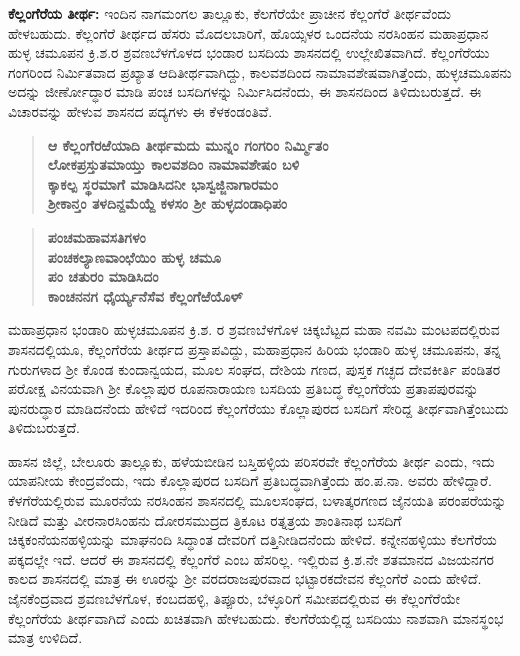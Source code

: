 \textbf{ಕೆಲ್ಲಂಗೆರೆಯ ತೀರ್ಥ:} ಇಂದಿನ ನಾಗಮಂಗಲ ತಾಲ್ಲೂಕು, ಕೆಲಗೆರೆಯೇ ಪ್ರಾಚೀನ ಕೆಲ್ಲಂಗೆರೆ ತೀರ್ಥವೆಂದು ಹೇಳಬಹುದು. ಕೆಲ್ಲಂಗೆರೆ ತೀರ್ಥದ ಹೆಸರು ಮೊದಲಬಾರಿಗೆ, ಹೊಯ್ಸಳರ ಒಂದನೆಯ ನರಸಿಂಹನ ಮಹಾಪ್ರಧಾನ ಹುಳ್ಳ ಚಮೂಪನ ಕ್ರಿ.ಶ.ರ ಶ್ರವಣಬೆಳಗೊಳದ ಭಂಡಾರ ಬಸದಿಯ ಶಾಸನದಲ್ಲಿ ಉಲ್ಲೇಖಿತವಾಗಿದೆ. ಕೆಲ್ಲಂಗೆರೆಯು ಗಂಗರಿಂದ ನಿರ್ಮಿತವಾದ ಪ್ರಖ್ಯಾತ ಆದಿತೀರ್ಥವಾಗಿದ್ದು, ಕಾಲವಶದಿಂದ ನಾಮಾವಶೇಷವಾಗಿತ್ತೆಂದು, ಹುಳ್ಳಚಮೂಪನು ಅದನ್ನು ಜೀರ್ಣೋದ್ಧಾರ ಮಾಡಿ ಪಂಚ ಬಸದಿಗಳನ್ನು ನಿರ್ಮಿಸಿದನೆಂದು, ಈ ಶಾಸನದಿಂದ ತಿಳಿದುಬರುತ್ತದೆ. ಈ ವಿಚಾರವನ್ನು ಹೇಳುವ ಶಾಸನದ ಪದ್ಯಗಳು ಈ ಕೆಳಕಂಡಂತಿವೆ.

\begin{verse}
\textbf{ಆ ಕೆಲ್ಲಂಗೆರಱೆಯಾದಿ ತೀರ್ಥಮದು ಮುನ್ನಂ ಗಂಗರಿಂ ನಿರ್ಮ್ಮಿತಂ\\ ಲೋಕಪ್ರಸ್ತುತಮಾಯ್ತು ಕಾಲವಶದಿಂ ನಾಮಾವಶೇಷಂ ಬಳಿ\\ ಕ್ಕಾಕಲ್ಪ ಸ್ಥರಮಾಗೆ ಮಾಡಿಸಿದನೀ ಭಾಸ್ವಜ್ಜಿನಾಗಾರಮಂ\\ ಶ‍್ರೀಕಾನ್ತಂ ತಳದಿನ್ದಮೆಯ್ದೆ ಕಳಸಂ ಶ‍್ರೀ ಹುಳ್ಳದಂಡಾಧಿಪಂ}
\end{verse}

\begin{verse}
\textbf{ಪಂಚಮಹಾವಸತಿಗಳಂ\\ ಪಂಚಕಲ್ಯಾಣವಾಂಛೆಯಿಂ ಹುಳ್ಳ ಚಮೂ\\ ಪಂ ಚತುರಂ ಮಾಡಿಸಿದಂ \\ ಕಾಂಚನನಗ ಧೈರ್ಯ್ಯನೆಸೆವ ಕೆಲ್ಲಂಗೆಱೆಯೊಳ್​}
\end{verse}

ಮಹಾಪ್ರಧಾನ ಭಂಡಾರಿ ಹುಳ್ಳಚಮೂಪನ ಕ್ರಿ.ಶ. ರ ಶ್ರವಣಬೆಳಗೊಳ ಚಿಕ್ಕಬೆಟ್ಟದ ಮಹಾ ನವಮಿ ಮಂಟಪದಲ್ಲಿರುವ ಶಾಸನದಲ್ಲಿಯೂ, ಕೆಲ್ಲಂಗೆರೆಯ ತೀರ್ಥದ ಪ್ರಸ್ತಾಪವಿದ್ದು, ಮಹಾಪ್ರಧಾನ ಹಿರಿಯ ಭಂಡಾರಿ ಹುಳ್ಳ ಚಮೂಪನು, ತನ್ನ ಗುರುಗಳಾದ ಶ‍್ರೀ ಕೊಂಡ ಕುಂದಾನ್ವಯದ, ಮೂಲ ಸಂಘದ, ದೇಶಿಯ ಗಣದ, ಪುಸ್ತಕ ಗಚ್ಛದ ದೇವಕೀರ್ತಿ ಪಂಡಿತರ ಪರೋಕ್ಷ ವಿನಯವಾಗಿ ಶ‍್ರೀ ಕೊಲ್ಲಾಪುರ ರೂಪನಾರಾಯಣ ಬಸದಿಯ ಪ್ರತಿಬದ್ಧ ಕೆಲ್ಲಂಗೆರೆಯ ಪ್ರತಾಪಪುರವನ್ನು ಪುನರುದ್ಧಾರ ಮಾಡಿದನೆಂದು ಹೇಳಿದೆ  ಇದರಿಂದ ಕೆಲ್ಲಂಗೆರೆಯು ಕೊಲ್ಲಾಪುರದ ಬಸದಿಗೆ ಸೇರಿದ್ದ ತೀರ್ಥವಾಗಿತ್ತೆಂಬುದು ತಿಳಿದುಬರುತ್ತದೆ.

ಹಾಸನ ಜಿಲ್ಲೆ, ಬೇಲೂರು ತಾಲ್ಲೂಕು, ಹಳೆಯಬೀಡಿನ ಬಸ್ತಿಹಳ್ಳಿಯ ಪರಿಸರವೇ ಕೆಲ್ಲಂಗೆರೆಯ ತೀರ್ಥ ಎಂದು, ಇದು ಯಾಪನೀಯ ಕೇಂದ್ರವೆಂದು, ಇದು ಕೊಲ್ಲಾಪುರದ ಬಸದಿಗೆ ಪ್ರತಿಬದ್ಧವಾಗಿತ್ತೆಂದು ಹಂ.ಪ.ನಾ. ಅವರು ಹೇಳಿದ್ದಾರೆ. ಕೆಳಗೆರೆಯಲ್ಲಿರುವ ಮೂರನೆಯ ನರಸಿಂಹನ ಶಾಸನದಲ್ಲಿ ಮೂಲಸಂಘದ, ಬಳಾತ್ಕರಗಣದ ಜೈನಯತಿ ಪರಂಪರೆಯನ್ನು ನೀಡಿದೆ ಮತ್ತು ವೀರನಾರಸಿಂಹನು ದೋರಸಮುದ್ರದ ತ್ರಿಕೂಟ ರತ್ನತ್ರಯ ಶಾಂತಿನಾಥ ಬಸದಿಗೆ ಚಿಕ್ಕಕಂನೆಯನಹಳ್ಳಿಯನ್ನು ಮಾಘನಂದಿ ಸಿದ್ಧಾಂತ ದೇವರಿಗೆ ದತ್ತಿನೀಡಿದನೆಂದು ಹೇಳಿದೆ. ಕನ್ನೇನಹಳ್ಳಿಯು ಕೆಲಗೆರೆಯ ಪಕ್ಕದಲ್ಲೇ ಇದೆ. ಆದರೆ ಈ ಶಾಸನದಲ್ಲಿ ಕೆಲ್ಲಂಗೆರೆ ಎಂಬ ಹೆಸರಿಲ್ಲ. ಇಲ್ಲಿರುವ ಕ್ರಿ.ಶ.ನೇ ಶತಮಾನದ ವಿಜಯನಗರ ಕಾಲದ ಶಾಸನದಲ್ಲಿ ಮಾತ್ರ ಈ ಊರನ್ನು ಶ‍್ರೀ ವರದರಾಜಪುರವಾದ ಭಟ್ಟಾರಕದೇವನ ಕೆಲ್ಲಂಗೆರೆ ಎಂದು ಹೇಳಿದೆ. ಜೈನಕೆಂದ್ರವಾದ ಶ್ರವಣಬೆಳಗೊಳ, ಕಂಬದಹಳ್ಳಿ, ತಿಪ್ಪೂರು, ಬೆಳ್ಳೂರಿಗೆ ಸಮೀಪದಲ್ಲಿರುವ ಈ ಕೆಲ್ಲಂಗೆರೆಯೇ ಕೆಲ್ಲಂಗೆರೆಯ ತೀರ್ಥವಾಗಿದೆ ಎಂದು ಖಚಿತವಾಗಿ ಹೇಳಬಹುದು. ಕೆಲಗೆರೆಯಲ್ಲಿದ್ದ ಬಸದಿಯು ನಾಶವಾಗಿ ಮಾನಸ್ಥಂಭ ಮಾತ್ರ ಉಳಿದಿದೆ.

